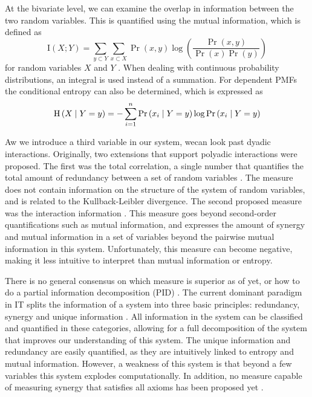 \documentclass[../main.tex]{subfiles}
\begin{document}
At the bivariate level, we can examine the overlap in information between the two random variables.
This is quantified using the mutual information, which is defined as 
%
\begin{equation}
\label{MI}
\mathrm{I} \left( X;Y \right) = \sum_{y \subset Y} \sum_{x \subset X} \Pr \left( x,y \right) \log (\frac{\Pr \left( x,y \right) }{\Pr \left( x \right) \Pr \left( y \right)})
\end{equation}
%
for random variables $X$ and $Y$ \cite{cover2012elements}.
When dealing with continuous probability distributions, an integral is used instead of a summation.
For dependent PMFs the conditional entropy can also be determined, which is expressed as 
%
\begin{equation}
\mathrm{H} \left(X \;\middle|\; Y = y \right) = -\sum^n_{i=1} \Pr \left( x_i \;\middle|\; Y = y \right) \log \Pr \left( x_i \;\middle|\; Y = y \right)
\end{equation}
%

Aw we introduce a third variable in our system, wecan look past dyadic interactions.
Originally, two extensions that support polyadic interactions were proposed.
The first was the total correlation, a single number that quantifies the total amount of redundancy between a set of random variables \cite{watanabe1960information}. 
The measure does not contain information on the structure of the system of random variables, and is related to the Kullback-Leibler divergence.
The second proposed measure was the interaction information \cite{mcgill1954multivariate}. 
This measure goes beyond second-order quantifications such as mutual information, and expresses the amount of synergy and mutual information in a set of variables beyond the pairwise mutual information in this system. 
Unfortunately, this measure can become negative, making it less intuitive to interpret than mutual information or entropy.

There is no general consensus on which measure is superior as of yet, or how to do a partial information decomposition (PID) \cite{griffith2011quantifying, williams2010nonnegative}.
The current dominant paradigm in IT splits the information of a system into three basic principles: redundancy, synergy and unique information \cite{williams2010nonnegative}.
All information in the system can be classified and quantified in these categories, allowing for a full decomposition of the system that improves our understanding of this system.
The unique information and redundancy are easily quantified, as they are intuitively linked to entropy and mutual information.
However, a weakness of this system is that beyond a few variables this system explodes computationally.
In addition, no measure capable of measuring synergy that satisfies all axioms has been proposed yet \cite{griffith2011quantifying}.
\end{document}
